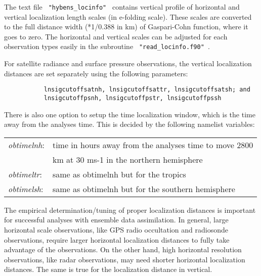 The text file \verb| "hybens_locinfo" | contains vertical profile of horizontal and vertical localization length scales (in e-folding scale). These scales are converted to the full distance width (*1/0.388 in km) of Gaspari-Cohn function, where it goes to zero. The horizontal and vertical scales can be adjusted for each observation types easily in the subroutine 
\verb| "read_locinfo.f90" |.

For satellite radiance and surface pressure observations, the vertical localization distances are set separately using the following parameters:
\begin{verbatim}
           lnsigcutoffsatnh, lnsigcutoffsattr, lnsigcutoffsatsh; and 
           lnsigcutoffpsnh, lnsigcutoffpstr, lnsigcutoffpssh
\end{verbatim}
There is also one option to setup the time localization window, which is the time away from the analyses time. This is decided by the following namelist variables:\\

\begin{table}[htbp]
\centering
\begin{tabular}{ll}

\textit{obtimelnh}: & time in hours away from the analyses time to move 2800 \\
                  & km at 30 ms-1 in the northern hemisphere  \\
                  
\textit{obtimeltr}: & same as obtimelnh but for the tropics \\
                  
\textit{obtimelsh}: & same as obtimelnh but for the southern hemisphere  \\
           
\end{tabular}
\end{table}


The empirical determination/tuning of proper localization distances is important for successful analyses with ensemble data assimilation. In general, large horizontal scale observations, like GPS radio occultation and radiosonde observations, require larger horizontal localization distances to fully take advantage of the observations. On the other hand, high horizontal resolution observations, like radar observations, may need shorter horizontal localization distances. The same is true for the localization distance in vertical.


